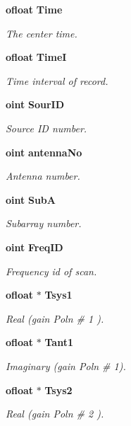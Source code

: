 \begin{CompactItemize}
{\bf ofloat} {\bf Time}
\begin{CompactList}\small\item\em The center time. \item\end{CompactList}\item 
{\bf ofloat} {\bf Time\-I}
\begin{CompactList}\small\item\em Time interval of record. \item\end{CompactList}\item 
{\bf oint} {\bf Sour\-ID}
\begin{CompactList}\small\item\em Source ID number. \item\end{CompactList}\item 
{\bf oint} {\bf antenna\-No}
\begin{CompactList}\small\item\em Antenna number. \item\end{CompactList}\item 
{\bf oint} {\bf Sub\-A}
\begin{CompactList}\small\item\em Subarray number. \item\end{CompactList}\item 
{\bf oint} {\bf Freq\-ID}
\begin{CompactList}\small\item\em Frequency id of scan. \item\end{CompactList}\item 
{\bf ofloat} $\ast$ {\bf Tsys1}
\begin{CompactList}\small\item\em Real (gain Poln \# 1 ). \item\end{CompactList}\item 
{\bf ofloat} $\ast$ {\bf Tant1}
\begin{CompactList}\small\item\em Imaginary (gain Poln \# 1). \item\end{CompactList}\item 
{\bf ofloat} $\ast$ {\bf Tsys2}
\begin{CompactList}\small\item\em Real (gain Poln \# 2 ). \item\end{CompactList}\item 

\end{CompactItemize}
